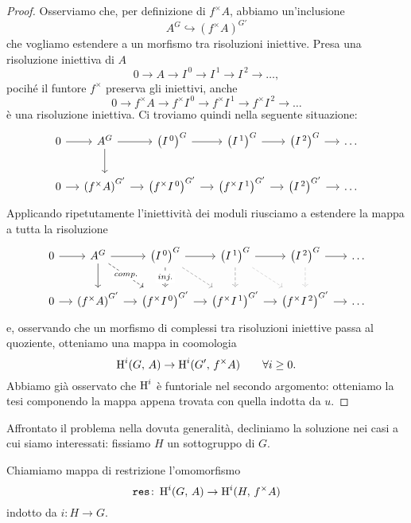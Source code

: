 \begin{proof}
	Osserviamo che, per definizione di $ f^\times A $, abbiamo un'inclusione
	\[ A^G \hookrightarrow \left(f^\times A\right)^{G'} \]
	che vogliamo estendere a un morfismo tra risoluzioni iniettive. Presa una risoluzione iniettiva di $ A $
	\[ 0 \to A \to I^{\,0} \to I^{\,1} \to I^{\,2} \to \dots, \]
	pocihé il funtore $ f^\times $ preserva gli iniettivi, anche
	\[ 0 \to f^\times A \to f^\times I^{\,0} \to f^\times I^{\,1} \to f^\times I^{\,2} \to \dots \]
	è una risoluzione iniettiva. Ci troviamo quindi nella seguente situazione:
	\[\begin{tikzcd}[column sep = small]
	0 \rar & A^G \rar \dar & \left(I^{\,0}\right)^G \rar & \left(I^{\,1}\right)^G \rar & \left(I^{\,2}\right)^G \rar & \dots \\
	0 \rar & \left(f^\times A\right)^{G'}  \rar & \left(f^\times I^{\,0}\right)^{G'} \rar & \left(f^\times I^{\,1}\right)^{G'} \rar & \left(I^{\, 2}\right)^{G'} \rar & \dots
	\end{tikzcd} \]
	Applicando ripetutamente l'iniettività dei moduli riusciamo a estendere la mappa a tutta la risoluzione 
	\[\begin{tikzcd}[column sep = small]
	0 \rar
	& A^G \dar \rar \arrow[dashed, "comp." description]{dr}
	& \left(I^{\,0}\right)^G \rar \dar[dashed, "inj." description] \arrow[dashed, gray]{dr}
	& \left(I^{\,1}\right)^{G} \rar \dar[dashed, gray] \arrow[dashed, gray!50]{dr}
	& \left(I^{\, 2}\right)^{G} \dar[dashed, gray!50] \rar
	& \dots \\
	0 \rar
	& \left(f^\times A\right)^{G'} \rar
	& \left(f^\times I^{\,0}\right)^{G'} \rar
	& \left(f^\times I^{\,1}\right)^{G'} \rar
	& \left(f^\times I^{\,2}\right)^{G'} \rar
	& \dots
	\end{tikzcd} \]
	e, osservando che un morfismo di complessi tra risoluzioni iniettive passa al quoziente, otteniamo una mappa in coomologia
	\[ \operatorname{H}^i(G, \, A) \to \operatorname{H}^i(G', \, f^\times A) \qquad \forall i \geq 0. \]
	Abbiamo già osservato che $ \operatorname{H}^i $ è funtoriale nel secondo argomento: otteniamo la tesi componendo la mappa appena trovata con quella indotta da $ u $.
\end{proof}

Affrontato il problema nella dovuta generalità, decliniamo la soluzione nei casi a cui siamo interessati: fissiamo $ H $ un sottogruppo di $ G $.
\begin{definition}[Restrizione]
	Chiamiamo mappa di restrizione l'omomorfismo
	\[ \operatorname{\mathtt{res}} \colon \operatorname{H}^i(G, \, A) \to \operatorname{H}^i(H, \, f^\times A) \]
	indotto da $ i \colon H \to G $.
\end{definition}

